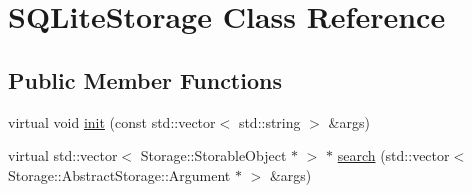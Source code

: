 \hypertarget{classSQLiteStorage}{
\section{SQLiteStorage Class Reference}
\label{db/d2a/classSQLiteStorage}
}
\subsection*{Public Member Functions}
\begin{DoxyCompactItemize}
\item 
virtual void \hyperlink{classSQLiteStorage_a1abd27f3824567fef222479a7c7a2333}{init} (const std::vector$<$ std::string $>$ \&args)
\item 
virtual std::vector$<$ Storage::StorableObject $\ast$ $>$ $\ast$ \hyperlink{classSQLiteStorage_ae3b74f8ac83d9f0c9d5cadc66daab68e}{search} (std::vector$<$ Storage::AbstractStorage::Argument $\ast$ $>$ \&args)
\end{DoxyCompactItemize}
